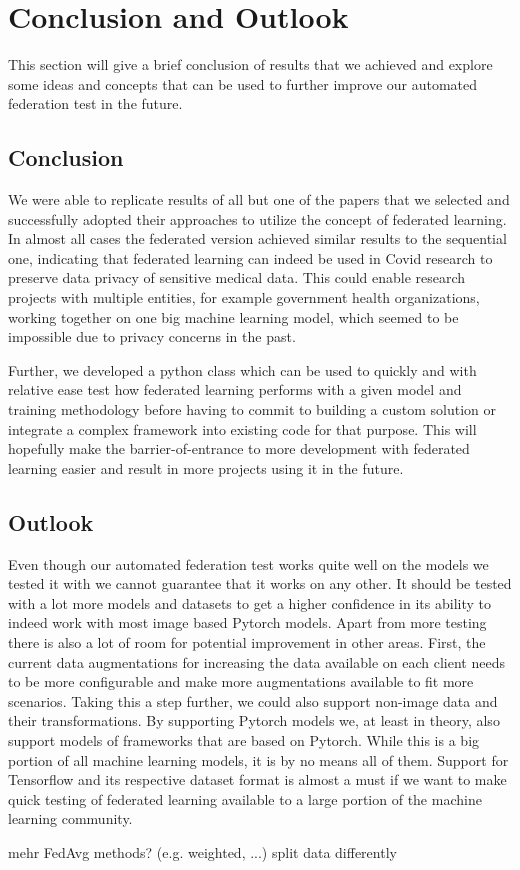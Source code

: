 \section{Conclusion and Outlook}
This section will give a brief conclusion of results that we achieved and explore some ideas and concepts that can be used to further improve our automated federation test in the future.  

\subsection{Conclusion}
We were able to replicate results of all but one of the papers that we selected and successfully adopted their approaches to utilize the concept of federated learning. In almost all cases the federated version achieved similar results to the sequential one, indicating that federated learning can indeed be used in Covid research to preserve data privacy of sensitive medical data. This could enable research projects with multiple entities, for example government health organizations, working together on one big machine learning model, which seemed to be impossible due to privacy concerns in the past.

Further, we developed a python class which can be used to quickly and with relative ease test how federated learning performs with a given model and training methodology before having to commit to building a custom solution or integrate a complex framework into existing code for that purpose. This will hopefully make the barrier-of-entrance to more development with federated learning easier and result in more projects using it in the future.

\subsection{Outlook}
Even though our automated federation test works quite well on the models we tested it with we cannot guarantee that it works on any other. It should be tested with a lot more models and datasets to get a higher confidence in its ability to indeed work with most image based Pytorch models.  
Apart from more testing there is also a lot of room for potential improvement in other areas. First, the current data augmentations for increasing the data available on each client needs to be more configurable and make more augmentations available to fit more scenarios. Taking this a step further, we could also support non-image data and their transformations.
By supporting Pytorch models we, at least in theory, also support models of frameworks that are based on Pytorch. While this is a big portion of all machine learning models, it is by no means all of them. Support for Tensorflow and its respective dataset format is almost a must if we want to make quick testing of federated learning available to a large portion of the machine learning community.

mehr FedAvg methods? (e.g. weighted, ...)
split data differently
